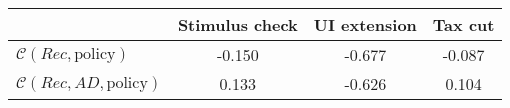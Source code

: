 \begin{tabular}{@{}lccc@{}} 
\toprule 
                          & Stimulus check      & UI extension    & Tax cut    \\  \midrule 
$\mathcal{C}(Rec,\text{policy})$ & -0.150  & -0.677  & -0.087     \\ 
$\mathcal{C}(Rec, AD,\text{policy})$ & 0.133  & -0.626  & 0.104     \\ 
\end{tabular}  
